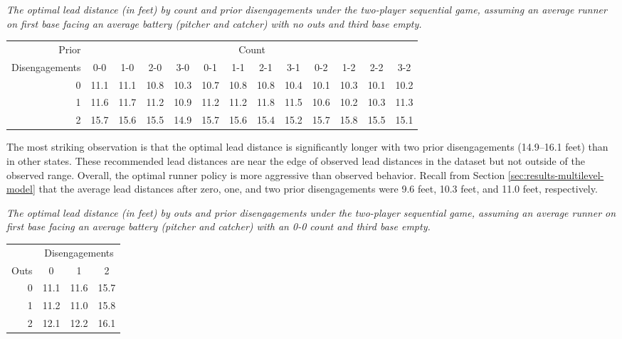 \documentclass[opre,dblanonrev]{informs4}
\begin{document}
      \begin{table}
        \TABLE
        {
          \it The optimal lead distance (in feet) by count and prior disengagements under the two-player sequential game, assuming an average runner on first base facing an average battery (pitcher and catcher) with no outs and third base empty.
         \label{tab:lead-by-count-two-player}}
        {\begin{tabular}{r|cccc|cccc|cccc}
    Prior & \multicolumn{12}{c}{Count}\\
    Disengagements & 0-0 & 1-0 & 2-0 & 3-0 & 0-1 & 1-1 & 2-1 & 3-1 & 0-2 & 1-2 & 2-2 & 3-2 \\
      \hline
    0 & 11.1 & 11.1 & 10.8 & 10.3 & 10.7 & 10.8 & 10.8 & 10.4 & 10.1 & 10.3 & 10.1 & 10.2 \\ 
      1 & 11.6 & 11.7 & 11.2 & 10.9 & 11.2 & 11.2 & 11.8 & 11.5 & 10.6 & 10.2 & 10.3 & 11.3 \\ 
      2 & 15.7 & 15.6 & 15.5 & 14.9 & 15.7 & 15.6 & 15.4 & 15.2 & 15.7 & 15.8 & 15.5 & 15.1 \\ 
    \end{tabular}}
        {}
      \end{table}

      The most striking observation is that the optimal lead distance is significantly longer with two prior disengagements (14.9--16.1 feet) than in other states. These recommended lead distances are near the edge of observed lead distances in the dataset but not outside of the observed range. Overall, the optimal runner policy is more aggressive than observed behavior. Recall from Section \ref{sec:results-multilevel-model} that the average lead distances after zero, one, and two prior disengagements were 9.6 feet, 10.3 feet, and 11.0 feet, respectively.

      \begin{table}
         \TABLE 
         {\it The optimal lead distance (in feet) by outs and prior disengagements under the two-player sequential game, assuming an average runner on first base facing an average battery (pitcher and catcher) with an 0-0 count and third base empty.        \label{tab:lead-by-outs-two-player}}
        {\begin{tabular}{r|ccc}
         & \multicolumn{3}{c}{Disengagements}\\
        Outs & 0 & 1 & 2 \\
          \hline
         0 & 11.1 & 11.6 & 15.7 \\ 
           1 & 11.2 & 11.0 & 15.8 \\ 
           2 & 12.1 & 12.2 & 16.1 \\ 
        \end{tabular}}
        {}
      \end{table}
\end{document}
